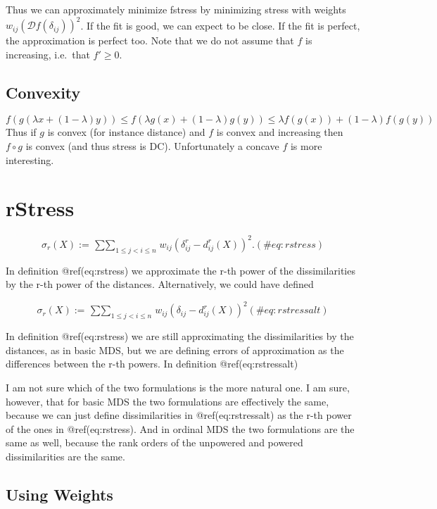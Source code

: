 \documentclass[
  12pt,
  letterpaper,
  DIV=11,
  numbers=noendperiod]{scrreprt}
\theoremstyle{remark}
\begin{document}
Thus we can approximately minimize fstress by minimizing stress with
weights \(w_{ij}(\mathcal{D}f(\delta_{ij}))^2\). If the fit is good, we
can expect to be close. If the fit is perfect, the approximation is
perfect too. Note that we do not assume that \(f\) is increasing,
i.e.~that \(f'\geq 0\).

\subsection{Convexity}\label{convexity}

\[
f(g(\lambda x + (1-\lambda)y))\leq f(\lambda g(x)+(1-\lambda)g(y))\leq\lambda f(g(x))+(1-\lambda)f(g(y))
\] Thus if \(g\) is convex (for instance distance) and \(f\) is convex
and increasing then \(f\circ g\) is convex (and thus stress is DC).
Unfortunately a concave \(f\) is more interesting.

\section{rStress}\label{rstress}

\begin{equation}
\sigma_r(X):=\mathop{\sum\sum}_{1\leq j<i\leq n}w_{ij}(\delta_{ij}^r-d_{ij}^r(X))^2.
(\#eq:rstress)
\end{equation}

In definition @ref(eq:rstress) we approximate the r-th power of the
dissimilarities by the r-th power of the distances. Alternatively, we
could have defined

\begin{equation}
\sigma_r(X):=\mathop{\sum\sum}_{1\leq j<i\leq n}w_{ij}(\delta_{ij}-d_{ij}^{r}(X))^2
(\#eq:rstressalt)
\end{equation}

In definition @ref(eq:rstress) we are still approximating the
dissimilarities by the distances, as in basic MDS, but we are defining
errors of approximation as the differences between the r-th powers. In
definition @ref(eq:rstressalt)

I am not sure which of the two formulations is the more natural one. I
am sure, however, that for basic MDS the two formulations are
effectively the same, because we can just define dissimilarities in
@ref(eq:rstressalt) as the r-th power of the ones in @ref(eq:rstress).
And in ordinal MDS the two formulations are the same as well, because
the rank orders of the unpowered and powered dissimilarities are the
same.

\subsection{Using Weights}\label{using-weights}
\end{document}
